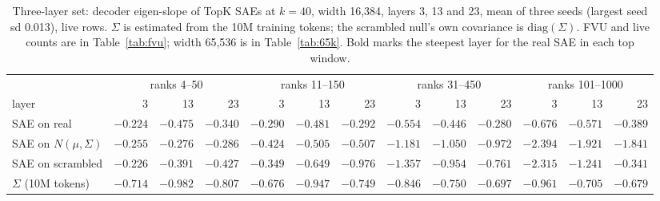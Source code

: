 \documentclass[10pt,twocolumn]{article}
\newcommand{\Sig}{\Sigma}
\begin{document}
\begin{table}[!htb]
\centering
\caption{Three-layer set: decoder eigen-slope of TopK SAEs at $k=40$, width 16,384, layers 3, 13 and 23, mean of three seeds (largest seed sd 0.013), live rows. $\Sig$ is estimated from the 10M training tokens; the scrambled null's own covariance is $\mathrm{diag}(\Sig)$. FVU and live counts are in Table~\ref{tab:fvu}; width 65,536 is in Table~\ref{tab:65k}. Bold marks the steepest layer for the real SAE in each top window.}
\label{tab:null}
\footnotesize
\setlength{\tabcolsep}{2.6pt}
\begin{tabular}{l rrr rrr rrr rrr}
\toprule
 & \multicolumn{3}{c}{ranks 4--50} & \multicolumn{3}{c}{ranks 11--150} & \multicolumn{3}{c}{ranks 31--450} & \multicolumn{3}{c}{ranks 101--1000} \\
\cmidrule(lr){2-4}\cmidrule(lr){5-7}\cmidrule(lr){8-10}\cmidrule(lr){11-13}
layer & 3 & 13 & 23 & 3 & 13 & 23 & 3 & 13 & 23 & 3 & 13 & 23 \\
\midrule
SAE on real & $-0.224$ & $\mathbf{-0.475}$ & $-0.340$ & $-0.290$ & $\mathbf{-0.481}$ & $-0.292$ & $-0.554$ & $-0.446$ & $-0.280$ & $-0.676$ & $-0.571$ & $-0.389$ \\
SAE on $N(\mu,\Sig)$ & $-0.255$ & $-0.276$ & $-0.286$ & $-0.424$ & $-0.505$ & $-0.507$ & $-1.181$ & $-1.050$ & $-0.972$ & $-2.394$ & $-1.921$ & $-1.841$ \\
SAE on scrambled & $-0.226$ & $-0.391$ & $-0.427$ & $-0.349$ & $-0.649$ & $-0.976$ & $-1.357$ & $-0.954$ & $-0.761$ & $-2.315$ & $-1.241$ & $-0.341$ \\
\midrule
$\Sig$ (10M tokens) & $-0.714$ & $-0.982$ & $-0.807$ & $-0.676$ & $-0.947$ & $-0.749$ & $-0.846$ & $-0.750$ & $-0.697$ & $-0.961$ & $-0.705$ & $-0.679$ \\
\bottomrule
\end{tabular}
\end{table}
\end{document}
